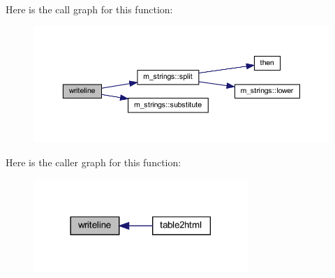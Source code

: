 Here is the call graph for this function\+:
\nopagebreak
\begin{figure}[H]
\begin{center}
\leavevmode
\includegraphics[width=350pt]{table2html_8f90_a8fd5b1ad7c5297852591499ca1e2db09_cgraph}
\end{center}
\end{figure}
Here is the caller graph for this function\+:
\nopagebreak
\begin{figure}[H]
\begin{center}
\leavevmode
\includegraphics[width=230pt]{table2html_8f90_a8fd5b1ad7c5297852591499ca1e2db09_icgraph}
\end{center}
\end{figure}

